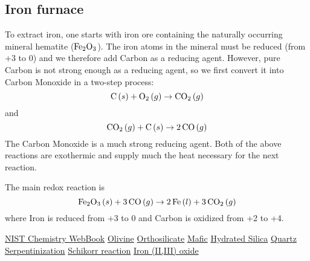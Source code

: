 \documentclass[a4paper,14pt]{extarticle}
\def\O{{\rm O}}
\def\C{{\rm C}}
\def\Fe{{\rm Fe}}
\begin{document}
\subsection{Iron furnace}
To extract iron, one starts with iron ore containing the naturally occurring mineral hematite ($\Fe_2\O_3$). The iron
atoms in the mineral must be reduced (from +3 to 0) and we therefore add Carbon as a reducing agent. However, pure Carbon is not
strong enough as a reducing agent, so we first convert it into Carbon Monoxide in a two-step process:
\[
    \C\,(s) + \O_2\,(g) \rightarrow \C\O_2\,(g)
\]
and
\[
    \C\O_2\,(g) + \C\,(s) \rightarrow 2\,\C\O\,(g)
\]
The Carbon Monoxide is a much strong reducing agent. Both of the above reactions are exothermic and supply much the heat
necessary for the next reaction.

The main redox reaction is
\[
    \Fe_2\O_3\,(s) + 3\,\C\O\,(g) \rightarrow 2\,\Fe\,(l) + 3\,\C\O_2\,(g)
\]
where Iron is reduced from +3 to 0 and Carbon is oxidized from +2 to +4.

\begin{thebibliography}{9}
                  \href{https://webbook.nist.gov/}{NIST Chemistry WebBook}
               \href{https://en.wikipedia.org/wiki/Olivine}{Olivine}
         \href{https://en.wikipedia.org/wiki/Orthosilicate}{Orthosilicate}
                 \href{https://en.wikipedia.org/wiki/Mafic}{Mafic}
       \href{https://en.wikipedia.org/wiki/Hydrated_silica}{Hydrated Silica}
                \href{https://en.wikipedia.org/wiki/Quartz}{Quartz}
      \href{https://en.wikipedia.org/wiki/Serpentinization}{Serpentinization}
     \href{https://en.wikipedia.org/wiki/Schikorr_reaction}{Schikorr reaction}
     \href{https://en.wikipedia.org/wiki/Iron(II,III)_oxide}{Iron (II,III) oxide}
\end{thebibliography}
\end{document}
